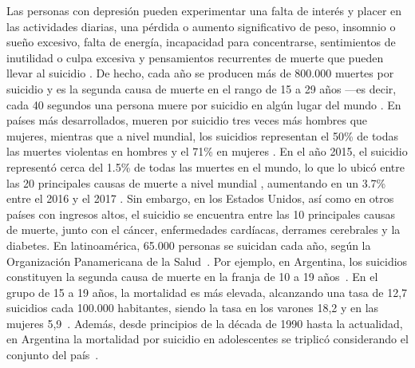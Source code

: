 Las personas con depresión pueden experimentar una falta de interés y placer en las actividades diarias, una pérdida o aumento significativo de peso, insomnio o sueño excesivo, falta de energía, incapacidad para concentrarse, sentimientos de inutilidad o culpa excesiva y pensamientos recurrentes de muerte que pueden llevar al suicidio \cite{apa2013}.
De hecho, cada año se producen más de 800.000 muertes por suicidio y es la segunda causa de muerte en el rango de 15 a 29 años ---es decir, cada 40 segundos una persona muere por suicidio en algún lugar del mundo \cite{who2014}.
En países más desarrollados, mueren por suicidio tres veces más hombres que mujeres, mientras que a nivel mundial, los suicidios representan el 50\% de todas las muertes violentas en hombres y el 71\% en mujeres \cite{who2014}.
En el año 2015, el suicidio representó cerca del 1.5\% de todas las muertes en el mundo, lo que lo ubicó entre las 20 principales causas de muerte a nivel mundial \cite{who2017}, aumentando en un 3.7\% entre el 2016 y el 2017 \cite{cdc2019}.
Sin embargo, en los Estados Unidos, así como en otros países con ingresos altos, el suicidio se encuentra entre las 10 principales causas de muerte, junto con el cáncer, enfermedades cardíacas, derrames cerebrales y la diabetes.
En latinoamérica, 65.000 personas se suicidan cada año, según la Organización Panamericana de la Salud~\cite{organizacion2014mortalidad}.
Por ejemplo, en Argentina, los suicidios constituyen la segunda causa de muerte en la franja de 10 a 19 años~\cite{martinez2016desigualdades}.
En el grupo de 15 a 19 años, la mortalidad es más elevada, alcanzando una tasa de 12,7 suicidios cada 100.000 habitantes, siendo la tasa en los varones 18,2 y en las mujeres 5,9~\cite{martinez2016desigualdades}.
Además, desde principios de la década de 1990 hasta la actualidad, en Argentina la mortalidad por suicidio en adolescentes se triplicó considerando el conjunto del país~\cite{martinez2016desigualdades}.




